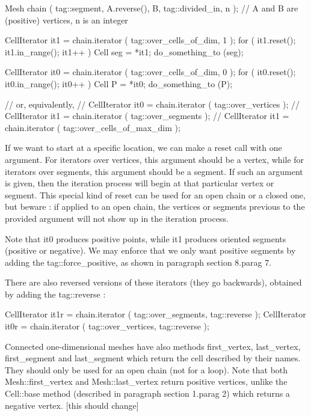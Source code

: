\verbatim
   Mesh chain ( tag::segment, A.reverse(), B, tag::divided_in, n );
   // A and B are (positive) vertices, n is an integer
   
   CellIterator it1 = chain.iterator ( tag::over_cells_of_dim, 1 );
   for ( it1.reset(); it1.in_range(); it1++ )
   {  Cell seg = *it1;  do_something_to (seg);  }
   
   CellIterator it0 = chain.iterator ( tag::over_cells_of_dim, 0 );
   for ( it0.reset(); it0.in_range(); it0++ )
   {  Cell P = *it0;  do_something_to (P);  }

   // or, equivalently,
   // CellIterator it0 = chain.iterator ( tag::over_vertices );
   // CellIterator it1 = chain.iterator ( tag::over_segments );
   // CellIterator it1 = chain.iterator ( tag::over_cells_of_max_dim );
\endverbatim

If we want to start at a specific location, we can make a {\codett reset} call with
one argument.
For iterators over vertices, this argument should be a vertex, while for iterators
over segments, this argument should be a segment.
If such an argument is given, then the iteration process will begin at that particular
vertex or segment.
This special kind of {\codett reset} can be used for an open chain or a closed one,
but beware : if applied to an open chain, the vertices or segments previous to the provided
argument will not show up in the iteration process.

Note that {\codett it0} produces positive points, while {\codett  it1} produces
oriented segments (positive or negative).
We may enforce that we only want positive segments by adding the {\codett tag::force\_positive},
as shown in paragraph \numb section 8.\numb parag 7.

There are also reversed versions of these iterators (they go backwards), obtained by adding
the {\codett tag::reverse} :

\verbatim
   CellIterator it1r = chain.iterator ( tag::over_segments, tag::reverse );
   CellIterator it0r = chain.iterator ( tag::over_vertices, tag::reverse );
\endverbatim

Connected one-dimensional meshes have also methods {\codett first\_vertex},
{\codett last\_vertex},\break
{\codett first\_segment} and {\codett last\_segment} which return the cell described by their
names.
They should only be used for an open chain (not for a loop).
Note that both {\codett Mesh::first\_vertex} and {\codett Mesh::last\_vertex} return
positive vertices, unlike the {\codett Cell::base} method (described in paragraph
\numb section 1.\numb parag 2) which returns a negative vertex. [this should change]

